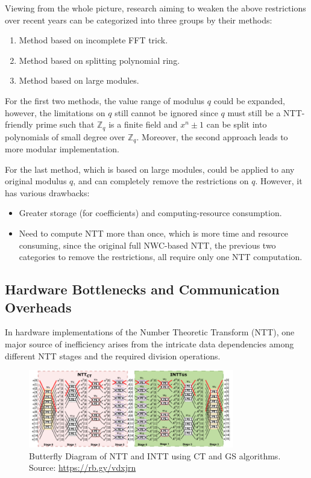 \documentclass[12pt]{article}
\begin{document}
Viewing from the whole picture, 
research aiming to weaken the above restrictions over recent years can be categorized into three groups by their methods:

\begin{enumerate}
    \item Method based on incomplete FFT trick.
    \item Method based on splitting polynomial ring.
    \item Method based on large modules.
\end{enumerate}
\cite[p.~11]{survey}

For the first two methods, the value range of modulus $q$ could be expanded, 
however, the limitations on $q$ still cannot be ignored since $q$ must still be a NTT-friendly prime such that
$\mathbb{Z}_q$ is a finite field and $x^n \pm 1$ can be split into polynomials of small degree over $\mathbb{Z}_q$.
Moreover, the second approach leads to more modular implementation. 
\cite[pp.~14--15]{survey}

For the last method, which is based on large modules, 
could be applied to any original modulus $q$, and can completely remove the restrictions on $q$.
However, it has various drawbacks:

\begin{itemize}
    \item Greater storage (for coefficients) and computing-resource consumption.
    \item Need to compute NTT more than once, which is more time and resource consuming, 
    since the original full NWC-based NTT, the previous two categories to remove the restrictions, 
    all require only one NTT computation.
\end{itemize}
\cite[p.~16]{survey}

\subsection{Hardware Bottlenecks and Communication Overheads}

In hardware implementations of the Number Theoretic Transform (NTT), 
one major source of inefficiency arises from the intricate data dependencies among different NTT stages
and the required division operations. 
\cite{bp_ntt}

\begin{figure}[h]
    \centering
    \includegraphics[width=0.8\textwidth]{Final_img/NTT_INTT_butterfly.png}
    \caption{Butterfly Diagram of NTT and INTT using CT and GS algorithms. Source: \url{https://rb.gy/vdxjrn}}
    \label{fig:NTT_INTT_butterfly}
\end{figure}
\end{document}
